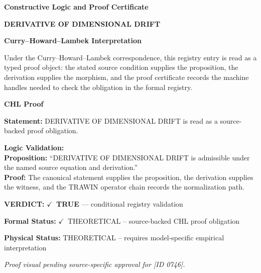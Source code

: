 \clearpage
\begingroup\tzpsupportsetup
\noindent\textbf{\fontsize{10.8pt}{12.8pt}\selectfont [ID 0746] Constructive Logic and Proof Certificate}\par
\noindent\textbf{\fontsize{10pt}{12pt}\selectfont DERIVATIVE OF DIMENSIONAL DRIFT}\par
\vspace{0.45em}
\begingroup
\footnotesize
\setlength{\parskip}{0.22em}
\setlength{\parindent}{0pt}
\noindent\textbf{Curry--Howard--Lambek Interpretation}\par
Under the Curry--Howard--Lambek correspondence, this registry entry is read as a typed proof
object: the stated source condition supplies the proposition, the derivation supplies the
morphism, and the proof certificate records the machine handles needed to check the obligation
in the formal registry.

\vspace{0.45em}
\noindent\textbf{CHL Proof}\par
\textbf{Statement:} DERIVATIVE OF DIMENSIONAL DRIFT is read as a source-backed proof obligation.

\textbf{Logic Validation:}\\
\textbf{Proposition:} ``DERIVATIVE OF DIMENSIONAL DRIFT is admissible under the named source equation and derivation.''\\
\textbf{Proof:} The canonical statement supplies the proposition, the derivation supplies the witness, and the TRAWIN operator chain records the normalization path.

\textbf{VERDICT:} \ensuremath{\checkmark}\ \textbf{TRUE} --- conditional registry validation

\textbf{Formal Status:} \ensuremath{\checkmark}\ THEORETICAL -- source-backed CHL proof obligation

\textbf{Physical Status:} THEORETICAL -- requires model-specific empirical interpretation
\par\vspace{0.45em}
\par
\vfill
\begingroup\footnotesize\itshape
Proof visual pending source-specific approval for [ID 0746].
\par\endgroup
\vfill
\endgroup
\endgroup
